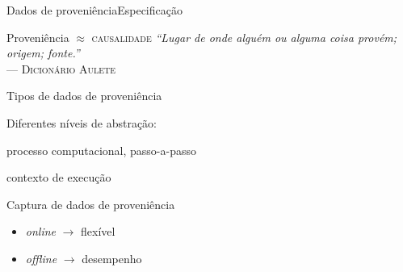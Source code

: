 \documentclass[12pt,compress,final]{beamer}
\newcommand{\nologo}{\setbeamertemplate{logo}{}} %
\begin{document}
{\nologo
\begin{frame}[t,squeeze]{Dados de proveniência}{Especificação}

\begin{alertblock}{Proveniência $\approx$ \textsc{causalidade}}
\textit{``Lugar de onde alguém ou alguma coisa provém; origem; fonte.''} \\
\hspace*{\fill}--- \textsc{Dicionário Aulete}
\end{alertblock}

\begin{exampleblock}{Tipos de dados de proveniência}
\centerline{Diferentes níveis de abstração:}
\begin{description}[retrospectiva]
\item[prospectiva] \alert{processo} computacional, passo-a-passo
\item[retrospectiva] contexto de \alert{execução}
\end{description}
\end{exampleblock}

\begin{block}{Captura de dados de proveniência}
\begin{itemize}
\item \textit{online} $\rightarrow$ flexível
\item \textit{offline} $\rightarrow$ desempenho
\end{itemize}
\end{block}

\end{frame}
}

\end{document}
